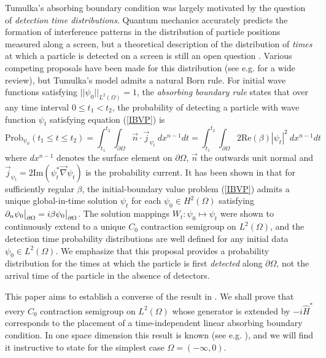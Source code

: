\documentclass{article}
\numberwithin{equation}{section}
\begin{document}
Tumulka's absorbing boundary condition was largely motivated by the question of \textit{detection time distributions}. Quantum mechanics accurately predicts the formation of interference patterns in the distribution of particle positions measured along a screen, but a theoretical description of the distribution of \textit{times} at which a particle is detected on a screen is still an open question \cite{Mielnik}. Various competing proposals have been made for this distribution (see e.g. \cite{MUGA2000353} for a wide review), but Tumulka's model admits a natural Born rule. For initial wave functions satisfying $||\psi_0||_{L^2(\Omega)}=1$, the \textit{absorbing boundary rule} states that over any time interval $0 \leq t_1 <t_2$, the probability of detecting a particle with wave function $\psi_t$ satisfying equation
(\ref{IBVP}) is
\begin{equation}
    \text{Prob}_{\psi_0}(t_1 \leq t \leq t_2)= \int_{t_1}^{t_2} \int_{\partial \Omega} \vec{n}\cdot \vec{j}_{\psi_t}~ dx^{n-1}dt=\int_{t_1}^{t_2}\int_{\partial \Omega} 2\text{Re}(\beta)|\psi_t|^2~ dx^{n-1}dt
\end{equation}
where $dx^{n-1}$ denotes the surface element on $\partial \Omega$, $\vec{n}$ the outwards unit normal and $\vec{j}_{\psi_t}=2\text{Im} (\psi_t^* \vec{\nabla}\psi_t)$ is the probability current. It has been shown in \cite{Existence} that for sufficiently regular $\beta$, the initial-boundary value problem (\ref{IBVP}) admits a unique global-in-time solution $\psi_t$ for each $\psi_0 \in H^2(\Omega)$ satisfying $\partial_n\psi_0 \big{|}_{\partial \Omega}=i\beta\psi_0 \big{|}_{\partial \Omega}$. The solution mappings $W_t:\psi_0 \mapsto\psi_t$ were shown to continuously extend to a unique $C_0$ contraction semigroup on $L^2(\Omega)$, and the detection time probability distributions are well defined for any initial data $\psi_0 \in L^2(\Omega)$. We emphasize that this proposal provides a probability distribution for the times at which the particle is first \textit{detected} along $\partial \Omega$, not the arrival time of the particle in the absence of detectors.
\par
This paper aims to establish a converse of the result in \cite{Existence}. We shall prove that every $C_0$ contraction semigroup on $L^2(\Omega)$ whose generator is extended by $-i\hat{H}^*$ corresponds to the placement of a time-independent linear absorbing boundary condition. In one space dimension this result is known (see e.g. \cite{Arendt2023}), and we will find it instructive to state for the simplest case $\Omega=(-\infty,0)$.
\end{document}
